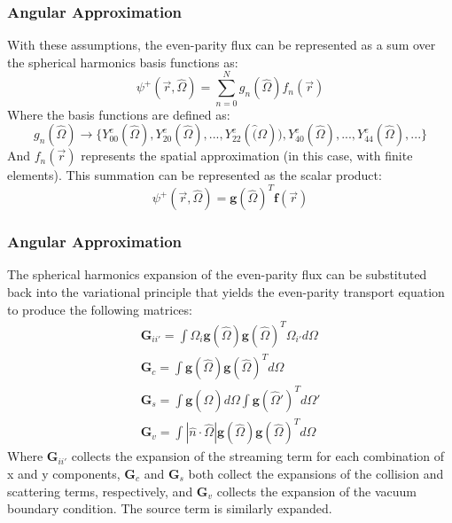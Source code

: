 \begin{frame}
  \frametitle{Angular Approximation}
  With these assumptions, the even-parity flux can be represented as a sum over the spherical harmonics basis functions as:
  \begin{equation}
    \psi^+(\vec{r},\hat{\Omega})=\sum_{n=0}^Ng_n(\hat{\Omega})f_n(\vec{r})
  \end{equation}
  Where the basis functions are defined as:
  \begin{equation}
    g_n(\hat{\Omega})\rightarrow\lbrace Y_{00}^e(\hat{\Omega}),Y_{20}^e(\hat{\Omega}),...,Y_{22}^e(\hat(\Omega)),Y_{40}^e(\hat{\Omega}),...,Y_{44}^e(\hat{\Omega}),...\rbrace
  \end{equation}
  And $f_n(\vec{r})$ represents the spatial approximation (in this case, with finite elements). This summation can be represented as the scalar product:
  \begin{equation}
    \psi^+(\vec{r},\hat{\Omega})=\textbf{g}(\hat{\Omega})^T\textbf{f}(\vec{r})
  \end{equation}
\end{frame}

\begin{frame}
  \frametitle{Angular Approximation}
  The spherical harmonics expansion of the even-parity flux can be substituted back into the variational principle that yields
  the even-parity transport equation to produce the following matrices:
  \begin{align}
    \textbf{G}_{ii'}=\int \Omega_i\textbf{g}(\hat{\Omega})\textbf{g}(\hat{\Omega})^T\Omega_{i'}d\Omega \\
    \textbf{G}_c=\int\textbf{g}(\hat{\Omega})\textbf{g}(\hat{\Omega})^Td\Omega                         \\
    \textbf{G}_s=\int\textbf{g}(\hat{\Omega})d\Omega\int\textbf{g}(\hat{\Omega}')^Td\Omega'            \\
    \textbf{G}_v=\int|\hat{n}\cdot\hat{\Omega}|\textbf{g}(\hat{\Omega})\textbf{g}(\hat{\Omega})^Td\Omega
  \end{align}
  Where $\textbf{G}_{ii'}$ collects the expansion of the streaming term for each combination of x and y components, $\textbf{G}_c$ and $\textbf{G}_s$ both collect the expansions of the collision and scattering terms, respectively, and $\textbf{G}_v$ collects the expansion of the vacuum boundary condition. The source term is similarly expanded.
\end{frame}


